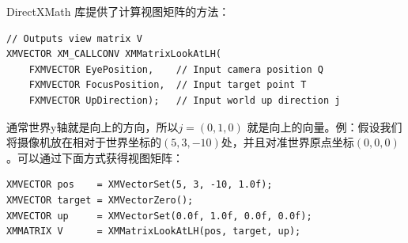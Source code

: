 \documentclass[11pt,a4paper,oldfontcommands]{memoir}
\begin{document}
{\begin{flushleft}
DirectXMath 库提供了计算视图矩阵的方法：
\begin{lstlisting}
// Outputs view matrix V
XMVECTOR XM_CALLCONV XMMatrixLookAtLH(
    FXMVECTOR EyePosition,    // Input camera position Q
    FXMVECTOR FocusPosition,  // Input target point T
    FXMVECTOR UpDirection);   // Input world up direction j
\end{lstlisting}
通常世界y轴就是向上的方向，所以$j=(0,1,0)$ 就是向上的向量。例：假设我们将摄像机放在相对于世界坐标的$(5,3,-10)$处，并且对准世界原点坐标$(0,0,0)$。可以通过下面方式获得视图矩阵：\\
\begin{lstlisting}
XMVECTOR pos    = XMVectorSet(5, 3, -10, 1.0f);
XMVECTOR target = XMVectorZero();
XMVECTOR up     = XMVectorSet(0.0f, 1.0f, 0.0f, 0.0f);
XMMATRIX V      = XMMatrixLookAtLH(pos, target, up);
\end{lstlisting}
\end{flushleft}
}
\end{document}
